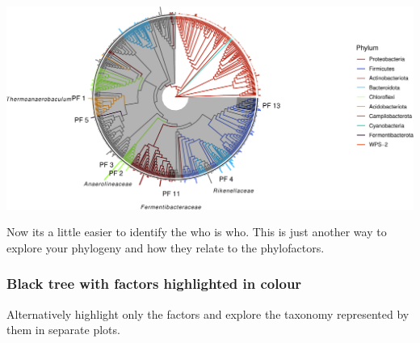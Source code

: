 \documentclass[
]{book}
\begin{document}
\includegraphics{gitbook-demo_files/figure-latex/coloredtree3-1.pdf}

Now its a little easier to identify the who is who. This is just another way to explore your phylogeny and how they relate to the phylofactors.

\hypertarget{black-tree-with-factors-highlighted-in-colour}{%
\subsubsection{Black tree with factors highlighted in colour}\label{black-tree-with-factors-highlighted-in-colour}}

Alternatively highlight only the factors and explore the taxonomy represented by them in separate plots.
\end{document}
